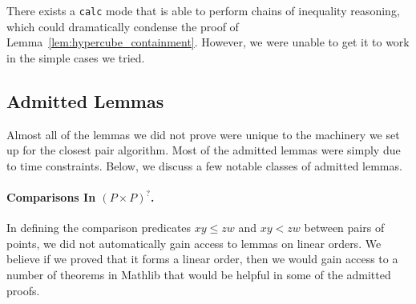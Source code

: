 \documentclass{article}
\begin{document}
There exists a \texttt{calc} mode that is able to perform chains of inequality reasoning, which could dramatically condense the proof of Lemma~\ref{lem:hypercube_containment}.
However, we were unable to get it to work in the simple cases we tried.



\subsection{Admitted Lemmas}
Almost all of the lemmas we did not prove were unique to the machinery we set up for the closest pair algorithm.
Most of the admitted lemmas were simply due to time constraints.
Below, we discuss a few notable classes of admitted lemmas.


\paragraph{Comparisons In $(P \times P)^?$.}
In defining the comparison predicates $x\!y \leq z\!w$ and $x\!y < z\!w$ between pairs of points, we did not automatically gain access to lemmas on linear orders.
We believe if we proved that it forms a linear order, then we would gain access to a number of theorems in Mathlib that would be helpful in some of the admitted proofs.
\end{document}
